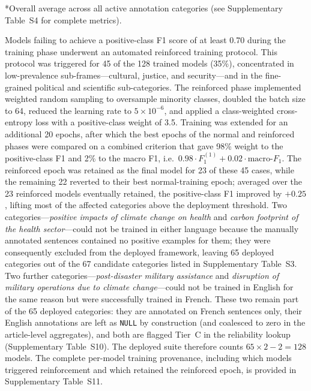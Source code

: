 \documentclass[12pt]{article}
\renewcommand\_{\texttt{\detokenize{_}\allowbreak}}
\begin{document}
\begin{table}[b!]
\centering
\caption{Model training performance metrics for primary annotation categories}
\label{tab:performance}
\small


\vspace{0.3em}
\noindent\footnotesize
*Overall average across all active annotation categories (see Supplementary Table~S4 for complete metrics).
\end{table}

Models failing to achieve a positive-class F1 score of at least 0.70 during the training phase underwent an automated reinforced training protocol. This protocol was triggered for 45 of the 128 trained models (35\%), concentrated in low-prevalence sub-frames---cultural, justice, and security---and in the fine-grained political and scientific sub-categories. The reinforced phase implemented weighted random sampling to oversample minority classes, doubled the batch size to 64, reduced the learning rate to $5\times 10^{-6}$, and applied a class-weighted cross-entropy loss with a positive-class weight of 3.5. Training was extended for an additional 20 epochs, after which the best epochs of the normal and reinforced phases were compared on a combined criterion that gave 98\% weight to the positive-class F1 and 2\% to the macro F1, i.e.\ $0.98 \cdot F_1^{(1)} + 0.02 \cdot \text{macro-}F_1$. The reinforced epoch was retained as the final model for 23 of these 45 cases, while the remaining 22 reverted to their best normal-training epoch; averaged over the 23 reinforced models eventually retained, the positive-class F1 improved by $+0.25$, lifting most of the affected categories above the deployment threshold. Two categories---\textit{positive impacts of climate change on health} and \textit{carbon footprint of the health sector}---could not be trained in either language because the manually annotated sentences contained no positive examples for them; they were consequently excluded from the deployed framework, leaving 65 deployed categories out of the 67 candidate categories listed in Supplementary Table~S3. Two further categories---\textit{post-disaster military assistance} and \textit{disruption of military operations due to climate change}---could not be trained in English for the same reason but were successfully trained in French. These two remain part of the 65 deployed categories: they are annotated on French sentences only, their English annotations are left as \texttt{NULL} by construction (and coalesced to zero in the article-level aggregates), and both are flagged Tier~C in the reliability lookup (Supplementary Table~S10). The deployed suite therefore counts $65 \times 2 - 2 = 128$ models. The complete per-model training provenance, including which models triggered reinforcement and which retained the reinforced epoch, is provided in Supplementary Table~S11.
\end{document}
